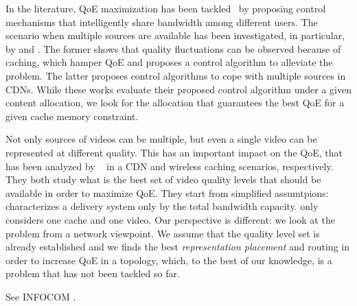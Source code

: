 \documentclass[10pt, journal,letterpaper]{IEEEtran}
\begin{document}
In the literature, QoE maximization has been tackled~\cite{Cofano2014,Lee2014,Liu2012b} by proposing control mechanisms that intelligently share bandwidth among different users.
The scenario when multiple sources are available has been investigated, in particular, by \cite{Lee2014} and \cite{Liu2012b}. The former shows that quality fluctuations can be observed because of caching, which hamper QoE and proposes a control algorithm to alleviate the problem.  The latter proposes control algorithms to cope with multiple sources in CDNs. While these works evaluate their proposed control algorithm under a given content allocation,  we look for the allocation that guarantees the best QoE for a given cache memory constraint.

Not only sources of videos can be multiple, but even a single video can be represented at different quality. This has an important impact on the QoE, that has been analyzed by ~\cite{Toni2014,Zhang2013} in a CDN and wireless caching scenarios, respectively. They both study what is the best set of video quality levels that should be available in order to maximize QoE. 
They start from simplified assumtpions: \cite{Toni2014} characterizes a delivery system only by the total bandwidth capacity. \cite{Zhang} only considers one cache and one video.
Our perspective is different: we look at the problem from a network viewpoint. We assume that the quality level set is already established and we finds the best \emph{representation placement} and routing in order to increase QoE in a topology, which, to the best of our knowledge, is a problem that has not been tackled so far.

See INFOCOM \cite{Adhikari2012}.



\end{document}
